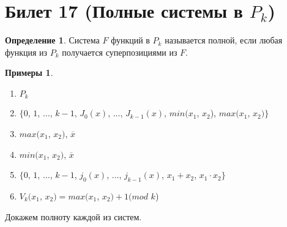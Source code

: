 \documentclass[a4paper, 12pt]{article}
\theoremstyle{definition}
\newtheorem*{definition}{Определение}
\newtheorem*{example}{Примеры}
\theoremstyle{plain}
\theoremstyle{remark}
\begin{document}
  \section{Билет 17 (Полные системы в $P_k$)}
  \begin{definition}
    Система $F$ функций в $P_k$ называется полной, если любая функция из $P_k$ получается суперпозициями из $F$.
  \end{definition}
  \begin{example}
    \begin{enumerate}
      \item $P_k$
      \item $\{0$, $1$, $\ldots$, $k-1$, $J_0(x)$, $\ldots$, $J_{k-1}(x)$, $min(x_1$, $x_2$), $max(x_1$, $x_2)\}$
      \item $max(x_1$, $x_2)$, $\overline{x}$
      \item $min(x_1$, $x_2)$, $\overline{x}$
      \item $\{0$, $1$, $\ldots$, $k-1$, $j_0(x)$, $\ldots$, $j_{k-1}(x)$, $x_1+x_2$, $x_1\cdot x_2\}$
      \item $V_k(x_1$, $x_2)=max(x_1$, $x_2)+1(mod$ $k$)
    \end{enumerate}
  \end{example}
  Докажем полноту каждой из систем.
\end{document}
